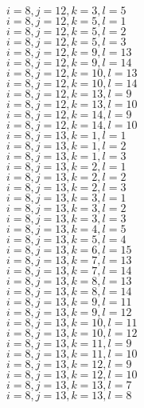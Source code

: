 \documentclass[14pt]{article}
\begin{document}
    $i=8,j=12,k=3,l=5 $ \\ 
    $i=8,j=12,k=5,l=1 $ \\ 
    $i=8,j=12,k=5,l=2 $ \\ 
    $i=8,j=12,k=5,l=3 $ \\ 
    $i=8,j=12,k=9,l=13 $ \\ 
    $i=8,j=12,k=9,l=14 $ \\ 
    $i=8,j=12,k=10,l=13 $ \\ 
    $i=8,j=12,k=10,l=14 $ \\ 
    $i=8,j=12,k=13,l=9 $ \\ 
    $i=8,j=12,k=13,l=10 $ \\ 
    $i=8,j=12,k=14,l=9 $ \\ 
    $i=8,j=12,k=14,l=10 $ \\ 
    $i=8,j=13,k=1,l=1 $ \\ 
    $i=8,j=13,k=1,l=2 $ \\ 
    $i=8,j=13,k=1,l=3 $ \\ 
    $i=8,j=13,k=2,l=1 $ \\ 
    $i=8,j=13,k=2,l=2 $ \\ 
    $i=8,j=13,k=2,l=3 $ \\ 
    $i=8,j=13,k=3,l=1 $ \\ 
    $i=8,j=13,k=3,l=2 $ \\ 
    $i=8,j=13,k=3,l=3 $ \\ 
    $i=8,j=13,k=4,l=5 $ \\ 
    $i=8,j=13,k=5,l=4 $ \\ 
    $i=8,j=13,k=6,l=15 $ \\ 
    $i=8,j=13,k=7,l=13 $ \\ 
    $i=8,j=13,k=7,l=14 $ \\ 
    $i=8,j=13,k=8,l=13 $ \\ 
    $i=8,j=13,k=8,l=14 $ \\ 
    $i=8,j=13,k=9,l=11 $ \\ 
    $i=8,j=13,k=9,l=12 $ \\ 
    $i=8,j=13,k=10,l=11 $ \\ 
    $i=8,j=13,k=10,l=12 $ \\ 
    $i=8,j=13,k=11,l=9 $ \\ 
    $i=8,j=13,k=11,l=10 $ \\ 
    $i=8,j=13,k=12,l=9 $ \\ 
    $i=8,j=13,k=12,l=10 $ \\ 
    $i=8,j=13,k=13,l=7 $ \\ 
    $i=8,j=13,k=13,l=8 $ \\ 
\end{document}
